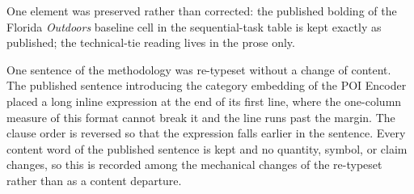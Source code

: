 

One element was preserved rather than corrected: the published bolding of the Florida
\emph{Outdoors} baseline cell in the sequential-task table is kept exactly as
published; the technical-tie reading lives in the prose only.


One sentence of the methodology was re-typeset without a change of content. The
published sentence introducing the category embedding of the POI Encoder placed a long
inline expression at the end of its first line, where the one-column measure of this
format cannot break it and the line runs past the margin. The clause order is reversed
so that the expression falls earlier in the sentence. Every content word of the
published sentence is kept and no quantity, symbol, or claim changes, so this is
recorded among the mechanical changes of the re-typeset rather than as a content
departure.

